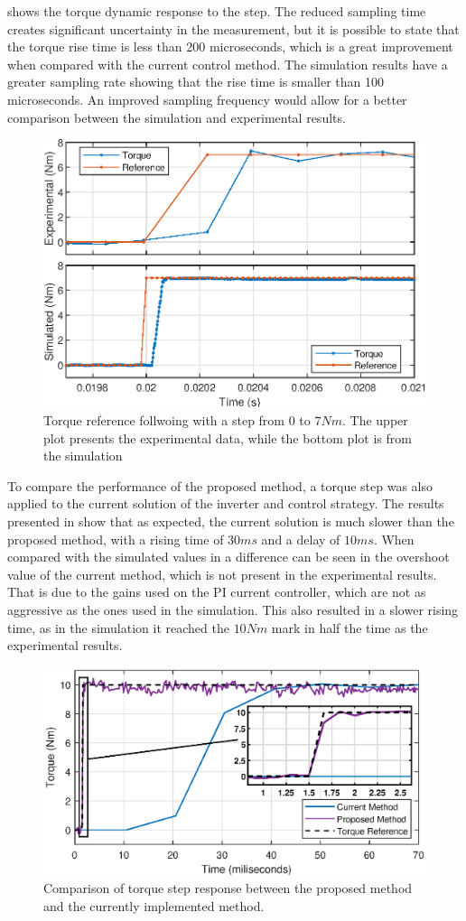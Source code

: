  shows the torque dynamic response to the step. The reduced sampling time creates significant uncertainty in the measurement, but it is possible to state that the torque rise time is less than 200 microseconds, which is a great improvement when compared with the current control method. The simulation results have a greater sampling rate showing that the rise time is smaller than 100 microseconds. An improved sampling frequency would allow for a better comparison between the simulation and experimental results.

\begin{figure}[!htb]
	\centering
	\includegraphics[width=0.55\linewidth]{Figures/Tq_step.eps}
	\caption[Torque reference follwoing with a step from $0$ to $7Nm$.]{Torque reference follwoing with a step from $0$ to $7Nm$. The upper plot presents the experimental data, while the bottom plot is from the simulation}
	\label{fig:tq_step_response_time} %
\end{figure}

To compare the performance of the proposed method, a torque step was also applied to the current solution of the inverter and control strategy. The results presented in  show that as expected, the current solution is much slower than the proposed method, with a rising time of $30ms$ and a delay of $10ms$. When compared with the simulated values in  a difference can be seen in the overshoot value of the current method, which is not present in the experimental results.  That is due to the gains used on the PI current controller, which are not as aggressive as the ones used in the simulation. This also resulted in a slower rising time, as in the simulation it reached the $10Nm$ mark in half the time as the experimental results.

\begin{figure}[!htb]
	\centering
	\includegraphics[width=0.7\linewidth]{Figures/Car_Tq_step.eps}
	\caption{Comparison of torque step response between the proposed method and the currently implemented method.}
	\label{fig:torque_step_comparison_FOC_MPC}%
\end{figure}

